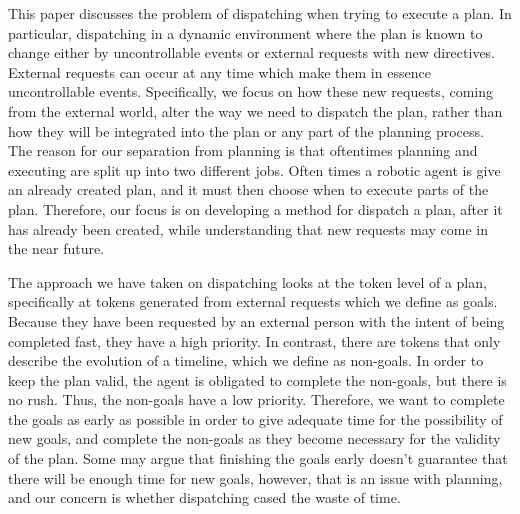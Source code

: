 This paper discusses the problem of dispatching when trying to execute
a plan. In particular, dispatching in a dynamic environment where the
plan is known to change either by uncontrollable events or external
requests with new directives. External requests  can occur
at any time which make them in essence uncontrollable events.
Specifically, we focus on how these new requests, coming from the
external world, alter the way we need to dispatch the plan, rather than
how they will be integrated into the plan or any part of the planning
process. The reason for our separation from planning is that
oftentimes planning and executing are split up into two different
jobs. Often times a robotic agent is give an already created plan, and it
must then choose when to execute parts of the plan. Therefore, our focus is on
developing a method for dispatch a plan, after it has already been created, while
understanding that new requests may come in the near future.

The approach we have taken on dispatching looks at the token level of a plan,
specifically at tokens generated from external requests which we define as goals.
Because they have been requested by an external person with the intent of being 
completed fast, they have a high priority. In contrast, there are tokens that only describe the
evolution of a timeline, which we define as non-goals. In order to keep the plan 
valid, the agent is obligated to complete the non-goals, but there is no rush. Thus, the
non-goals have a low priority. Therefore, we want to complete the goals
as early as possible in order to give adequate time for the possibility of new
goals, and complete the non-goals as they become necessary for the validity of the plan. 
Some may argue that finishing the goals early doesn't guarantee that
there will be enough time for new goals, however, that is an issue with planning, 
and our concern is whether dispatching cased the waste of time.



